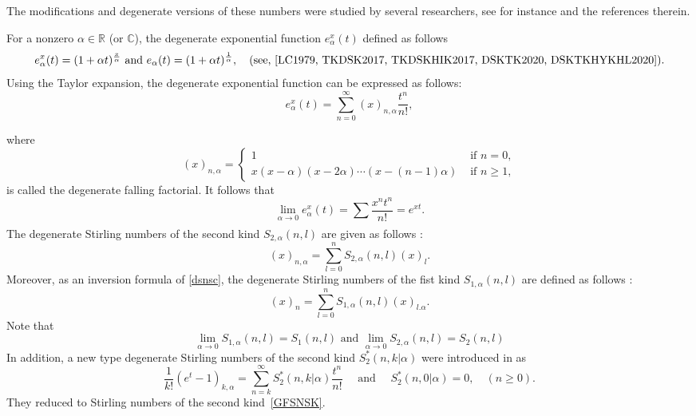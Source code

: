 \documentclass{amsart}
\numberwithin{equation}{section}
\theoremstyle{definition}
\theoremstyle{remark}
\begin{document}
The modifications and degenerate versions of these numbers were studied by several researchers, see for instance \cite{LO2023, ABYSHMS2024, FTH1985, LCHPJSS1998, DSKTK2017, TKDSKHYKJW2019, IKYS2021, TMMS2012, LO2020, LO2022, MDS2028, YS2013, HKK2022} and the references therein.

For a nonzero $\alpha\in\mathbb{R}$ (or $\mathbb{C}$), the degenerate exponential function $e_{\alpha}^{x}(t)$ defined as follows
\begin{equation}\label{degexpfun}
    e_{\alpha}^{x}(t)=(1+\alpha t)^{\frac{x}{\alpha}} \text{ and } e_{\alpha}(t)=(1+\alpha t)^{\frac{1}{\alpha}},\quad \text{(see,~\cite{LC1979, TKDSK2017, TKDSKHIK2017, DSKTK2020, DSKTKHYKHL2020})}.
\end{equation}
Using the Taylor expansion, the degenerate exponential function can be expressed as follows:
\begin{equation}\label{tdegexpfun}
 e_{\alpha}^{x}(t)=\sum_{n=0}^{\infty}(x)_{n,\alpha}\frac{t^n}{n!},   
\end{equation}

where 
$$(x)_{n, \alpha}=\begin{cases}
     1 & \text{ if } n=0, \\[6pt]
    x(x-\alpha)(x-2\alpha)\cdots (x-(n-1)\alpha) & \text{ if } n\geq 1,
  \end{cases}$$
is called the degenerate falling factorial. It follows that 
$$\lim_{\alpha\rightarrow{ 0}}e_{\alpha}^{x}(t)=\sum_{}\frac{x^nt^n}{n!}=e^{xt}.$$
The degenerate Stirling numbers of the second kind $S_{2, \alpha}(n, l)$ are given as follows \cite{TK2017, DSKTK2020, DSKTKHYKHL2020, TKDSKHKK2022}:
\begin{equation}\label{dsnsc}
  (x)_{n, \alpha}=\sum_{l=0}^{n}S_{2, \alpha}(n, l)(x)_{l}. 
\end{equation}
Moreover, as an inversion formula of \eqref{dsnsc}, the degenerate Stirling numbers of the fist kind $S_{1, \alpha}(n, l)$ are defined as follows \cite{TK2017, DSKTK2020, DSKTKHYKHL2020}:
\begin{equation}\label{dsnfc}
  (x)_{n}=\sum_{l=0}^{n}S_{1, \alpha}(n, l)(x)_{l.\alpha}. 
\end{equation}
Note that 
$$\lim_{\alpha\rightarrow 0}S_{1, \alpha}(n, l)=S_{1}(n, l) \text{ and } \lim_{\alpha\rightarrow 0}S_{2, \alpha}(n, l)=S_{2}(n, l)$$
In addition, a new type degenerate Stirling numbers of the second kind $S_{2}^*(n,k|\alpha)$ were introduced in \cite{HKK2022} as 
\begin{equation}\label{ntSnHKK}
\frac{1}{k!}(e^t-1)_{k,\alpha}=\sum_{n=k}^{\infty}S_{2}^*(n,k|\alpha)\frac{t^n}{n!} \quad \text{ and } \quad S_{2}^*(n,0|\alpha)=0, \quad(n\geq 0).
\end{equation}
They reduced to Stirling numbers of the second kind~\eqref{GFSNSK}.
\end{document}
